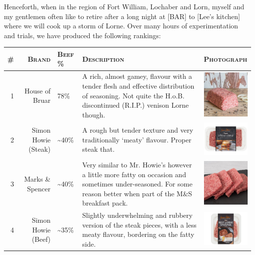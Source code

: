 \documentclass[11pt, english]{article}
\begin{document}
		Henceforth, when in the region of Fort William, Lochaber and Lorn, myself and my gentlemen often like to retire after a long night at [BAR] to [Lee's kitchen] where we will cook up a storm of Lorne. Over many hours of experimentation and trials, we have produced the following rankings:

		\begin{table}[h]
			\scriptsize
			\renewcommand{\arraystretch}{1.25}
		\begin{center}
		\begin{tabular}{rr|p{1.25cm}p{3.5cm}p{2.5cm}}
			\textsc{\#} & \textsc{Brand} & \textsc{Beef \%} & \textsc{Description} & \textsc{Photograph}\\
			\hline
			1 & House of Bruar & 78\% & A rich, almost gamey, flavour with a tender flesh and effective distribution of seasoning. Not quite the H.o.B. discontinued (R.I.P.) venison Lorne though. & \vspace{-0.25cm}\includegraphics[width=2.5cm]{../System/Photos/bruar_lorne.jpg}\\
			2 & Simon Howie (Steak) & \textasciitilde40\% & A rough but tender texture and very traditionally `meaty' flavour. Proper steak that. & \vspace{-0.25cm}\includegraphics[width=2.5cm]{../System/Photos/sh_lorne.png}\\
			3 & Marks \& Spencer & \textasciitilde40\% & Very similar to Mr. Howie's however a little more fatty on occasion and sometimes under-seasoned. For some reason better when part of the M\&S breakfast pack. & \vspace{-0.25cm}\includegraphics[width=2.5cm]{../System/Photos/ms_lorne.jpeg}\\
			4 & Simon Howie (Beef) & \textasciitilde35\% & Slightly underwhelming and rubbery version of the steak pieces, with a less meaty flavour, bordering on the fatty side. & \vspace{-0.25cm}\includegraphics[width=2.5cm]{../System/Photos/sh_lorne2.png}\\

\end{tabular}
\end{center}
\end{table}
\end{document}
